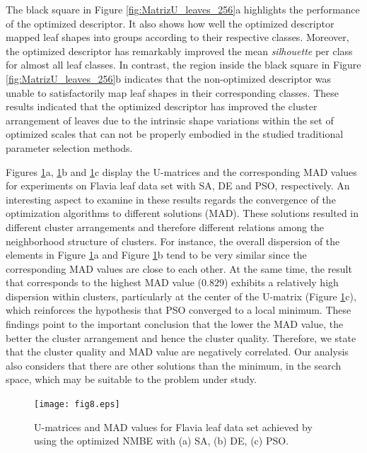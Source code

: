 {\color{red}
The black square in Figure \ref{fig:MatrizU_leaves_256}a highlights  the performance of the optimized descriptor. It also shows how well the optimized descriptor mapped leaf shapes into groups according to their respective classes.  Moreover, the optimized descriptor has remarkably improved  the mean \emph{silhouette} per class for almost all leaf classes. In contrast, the region inside the black square in Figure \ref{fig:MatrizU_leaves_256}b indicates that the non-optimized descriptor was unable to satisfactorily map leaf shapes in their corresponding classes.
These results  indicated that the optimized descriptor has improved the cluster arrangement of leaves due to the intrinsic shape variations within the set of optimized scales that can not be properly embodied in the studied traditional parameter selection methods.

Figures \ref{fig:MatrizU_leaves_II}a, \ref{fig:MatrizU_leaves_II}b and \ref{fig:MatrizU_leaves_II}c display the U-matrices and the corresponding MAD values for experiments on Flavia leaf data set with SA, DE and PSO, respectively. An interesting aspect to examine in these results regards the convergence of the optimization algorithms to different solutions (MAD). These solutions resulted in different cluster arrangements and therefore different relations among the neighborhood structure of clusters. For instance, the overall dispersion  of the elements in Figure \ref{fig:MatrizU_leaves_II}a and Figure \ref{fig:MatrizU_leaves_II}b tend to be very similar since  the corresponding MAD values are close to each other. At the same time, the result that corresponds to the highest MAD value ($0.829$) exhibits a relatively high dispersion within clusters, particularly at the center of the U-matrix (Figure \ref{fig:MatrizU_leaves_II}c), which reinforces the hypothesis that  PSO converged to a local minimum. These findings point to the important conclusion that the lower the MAD value, the better the cluster arrangement and hence the cluster quality. Therefore, we state that the cluster quality and MAD value are negatively correlated. Our analysis also considers that there are other solutions than the minimum, in the search space, which may be suitable to the problem under study. 

\begin{figure}[h!]
\centering
\texttt{[image: fig8.eps]}
 \caption{\label{fig:MatrizU_leaves_II}U-matrices and MAD values for Flavia leaf data set achieved by using  the optimized NMBE with (a) SA, (b) DE, (c) PSO.}
\end{figure}

}

